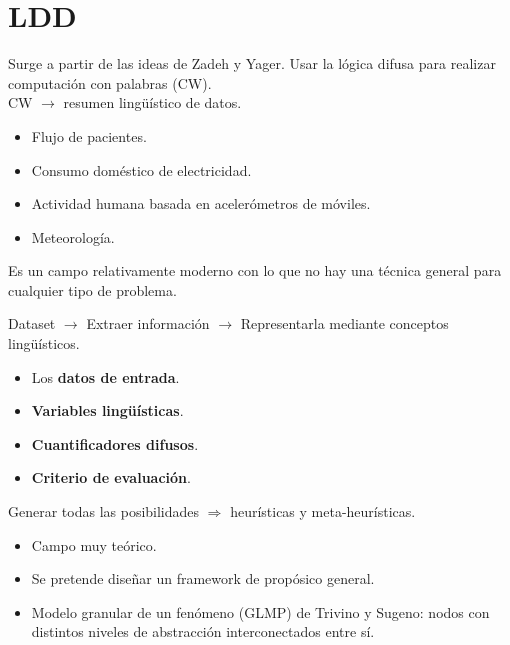 \documentclass{beamer}
\begin{document}
	\section{LDD}
	
	\begin{frame}
		Surge a partir de las ideas de Zadeh y Yager. Usar la lógica difusa para realizar computación con palabras (CW).\\
				
		CW $\longrightarrow$ resumen lingüístico de datos.
		
		\begin{itemize}
			\item Flujo de pacientes.
			\item Consumo doméstico de electricidad.
			\item Actividad humana basada en acelerómetros de móviles.
			\item Meteorología.
		\end{itemize}
		
		Es un campo relativamente moderno con lo que no hay una técnica general para cualquier tipo de problema.
	\end{frame}
	
	\begin{frame}
		Dataset $\longrightarrow$ Extraer información  $\longrightarrow$ Representarla mediante conceptos lingüísticos.
		
		\begin{itemize}
			\item Los \textbf{datos de entrada}.
			\item \textbf{Variables lingüísticas}.
			\item \textbf{Cuantificadores difusos}.
			\item \textbf{Criterio de evaluación}.
		\end{itemize}
		
		Generar todas las posibilidades $\Rightarrow$ heurísticas y meta-heurísticas.
	\end{frame}
	
	\begin{frame}
		\begin{itemize}
			\item Campo muy teórico.
			\item Se pretende diseñar un framework de propósico general.
			\item Modelo granular de un fenómeno (GLMP) de Trivino y Sugeno: nodos con distintos niveles de abstracción interconectados entre sí.
		\end{itemize}		
	\end{frame}
	
\end{document}
